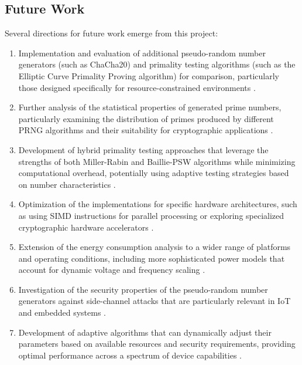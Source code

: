 \subsection{Future Work}

Several directions for future work emerge from this project:

\begin{enumerate}
    \item Implementation and evaluation of additional pseudo-random number generators (such as ChaCha20) and primality testing algorithms (such as the Elliptic Curve Primality Proving algorithm) for comparison, particularly those designed specifically for resource-constrained environments \cite{resource_constrained, primality_survey}.
    
    \item Further analysis of the statistical properties of generated prime numbers, particularly examining the distribution of primes produced by different PRNG algorithms and their suitability for cryptographic applications \cite{nist_test_suite}.
    
    \item Development of hybrid primality testing approaches that leverage the strengths of both Miller-Rabin and Baillie-PSW algorithms while minimizing computational overhead, potentially using adaptive testing strategies based on number characteristics \cite{primality_survey}.
    
    \item Optimization of the implementations for specific hardware architectures, such as using SIMD instructions for parallel processing or exploring specialized cryptographic hardware accelerators \cite{embedded_benchmarking, hardware_optimized}.
    
    \item Extension of the energy consumption analysis to a wider range of platforms and operating conditions, including more sophisticated power models that account for dynamic voltage and frequency scaling \cite{energy_efficient, energy_prng}.
    
    \item Investigation of the security properties of the pseudo-random number generators against side-channel attacks that are particularly relevant in IoT and embedded systems \cite{iot_survey, embedded_crypto}.
    
    \item Development of adaptive algorithms that can dynamically adjust their parameters based on available resources and security requirements, providing optimal performance across a spectrum of device capabilities \cite{energy_efficient, prime_iot}.
\end{enumerate}

